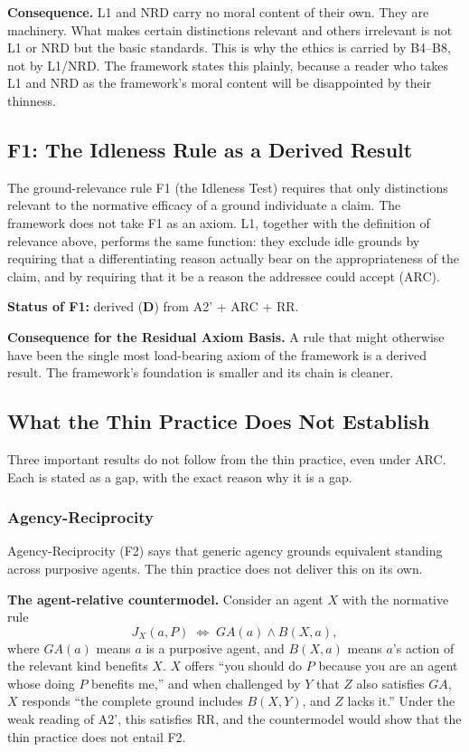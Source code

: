 \documentclass[11pt]{article}
\def\ensuremath#1{#1}%
\def\mathrm#1{#1}%
\newcommand{\statusD}{\textcolor{stD}{\textbf{D}}}
\newcommand{\Atwo}{\texorpdfstring{\ensuremath{\mathrm{A2}'}}{A2'}}
\begin{document}
\textbf{Consequence.} L1 and NRD carry no moral content of their own. They are machinery. What makes certain distinctions relevant and others irrelevant is not L1 or NRD but the basic standards. This is why the ethics is carried by B4--B8, not by L1/NRD. The framework states this plainly, because a reader who takes L1 and NRD as the framework's moral content will be disappointed by their thinness.

\subsection{F1: The Idleness Rule as a Derived Result}
The ground-relevance rule F1 (the Idleness Test) requires that only distinctions relevant to the normative efficacy of a ground individuate a claim. The framework does not take F1 as an axiom. L1, together with the definition of relevance above, performs the same function: they exclude idle grounds by requiring that a differentiating reason actually bear on the appropriateness of the claim, and by requiring that it be a reason the addressee could accept (ARC).

\textbf{Status of F1:} derived (\statusD{}) from \Atwo{} + ARC + RR.

\textbf{Consequence for the Residual Axiom Basis.} A rule that might otherwise have been the single most load-bearing axiom of the framework is a derived result. The framework's foundation is smaller and its chain is cleaner.

\subsection{What the Thin Practice Does Not Establish}
Three important results do not follow from the thin practice, even under ARC. Each is stated as a gap, with the exact reason why it is a gap.

\subsubsection{Agency-Reciprocity}
Agency-Reciprocity (F2) says that generic agency grounds equivalent standing across purposive agents. The thin practice does not deliver this on its own.

\textbf{The agent-relative countermodel.} Consider an agent $X$ with the normative rule
\[
J_X(a, P) \;\iff\; GA(a) \land B(X, a),
\]
where $GA(a)$ means $a$ is a purposive agent, and $B(X, a)$ means $a$'s action of the relevant kind benefits $X$. $X$ offers ``you should do $P$ because you are an agent whose doing $P$ benefits me,'' and when challenged by $Y$ that $Z$ also satisfies $GA$, $X$ responds ``the complete ground includes $B(X, Y)$, and $Z$ lacks it.'' Under the weak reading of \Atwo{}, this satisfies RR, and the countermodel would show that the thin practice does not entail F2.
\end{document}
